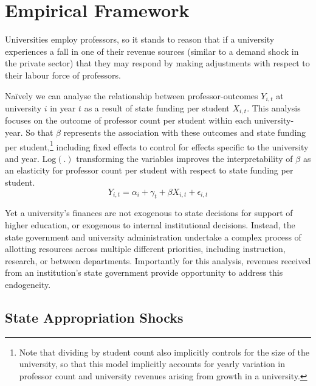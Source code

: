 \section{Empirical Framework}
\label{sec:empirics}

Universities employ professors, so it stands to reason that if a university experiences a fall in one of their revenue sources (similar to a demand shock in the private sector) that they may respond by making adjustments with respect to their labour force of professors.

Na\"ively we can analyse the relationship between professor-outcomes $Y_{i,t}$ at university $i$ in year $t$ as a result of state funding per student $X_{i,t}$.
This analysis focuses on the outcome of professor count per student within each university-year.
So that $\beta$ represents the association with these outcomes and state funding per student,\footnote{
    Note that dividing by student count also implicitly controls for the size of the university, so that this model implicitly accounts for yearly variation in professor count and university revenues arising from growth in a university.
}
including fixed effects to control for effects specific to the university and year.
Log$(.)$ transforming the variables improves the interpretability of $\beta$ as an elasticity for professor count per student with respect to state funding per student.
\begin{equation}
    \label{eqn:naivereg}
    Y_{i,t} = \alpha_i + \gamma_t + \beta X_{i,t} + \epsilon_{i,t}
\end{equation}

Yet a university's finances are not exogenous to state decisions for support of higher education, or exogenous to internal institutional decisions.
Instead, the state government and university administration undertake a complex process of allotting resources across multiple different priorities, including instruction, research, or between departments.
Importantly for this analysis, revenues received from an institution's state government provide opportunity to address this endogeneity.


\subsection{State Appropriation Shocks}
\label{sec:approp-shocks}

